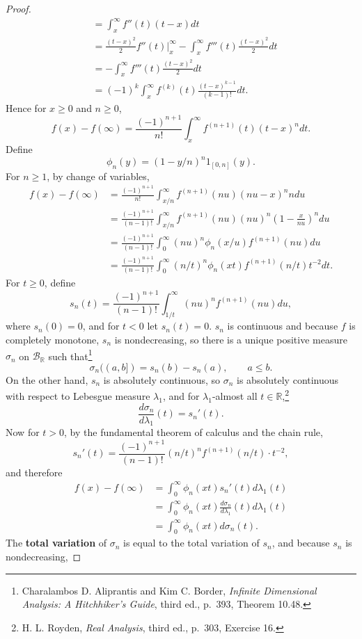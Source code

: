 \documentclass{article}
\theoremstyle{definition}
\theoremstyle{definition}
\begin{document}
\begin{proof}
\begin{align*}
&=\int_x^\infty f''(t) (t-x) dt\\
&=\frac{(t-x)^2}{2} f''(t) \Big|_x^\infty - \int_x^\infty f'''(t) \frac{(t-x)^2}{2} dt\\
&=- \int_x^\infty f'''(t) \frac{(t-x)^2}{2} dt\\
&=(-1)^k \int_x^\infty f^{(k)}(t) \frac{(t-x)^{k-1}}{(k-1)!} dt.
\end{align*}
Hence for $x \geq 0$ and $n \geq 0$, 
\[
f(x)-f(\infty) = \frac{(-1)^{n+1}}{n!} \int_x^\infty f^{(n+1)}(t) (t-x)^n dt.
\]
Define
\[
\phi_n(y) = (1-y/n)^n 1_{[0,n]}(y).
\]
For $n \geq 1$,
by change of variables,
\begin{align*}
f(x)-f(\infty)&=\frac{(-1)^{n+1}}{n!} \int_{x/n}^\infty f^{(n+1)}(nu) (nu-x)^n ndu\\
&=\frac{(-1)^{n+1}}{(n-1)!} \int_{x/n}^\infty f^{(n+1)}(nu) (nu)^n \left(1-\frac{x}{nu}\right)^n du\\
&=\frac{(-1)^{n+1}}{(n-1)!} \int_0^\infty (nu)^n \phi_n(x/u) f^{(n+1)}(nu)  du\\
&=\frac{(-1)^{n+1}}{(n-1)!} \int_0^\infty (n/t)^n \phi_n(xt) f^{(n+1)}(n/t) t^{-2}dt.
\end{align*}
For $t \geq 0$, define
\[
s_n(t) = \frac{(-1)^{n+1}}{(n-1)!} \int_{1/t}^\infty  (nu)^n f^{(n+1)}(nu) du,
\]
where $s_n(0)=0$, 
and for $t<0$ let $s_n(t)=0$. $s_n$ is continuous
and because $f$ is completely monotone, $s_n$ is nondecreasing, so there is a unique positive
measure $\sigma_n$ on $\mathscr{B}_{\mathbb{R}}$ such that\footnote{Charalambos D. Aliprantis
and Kim C. Border, {\em Infinite Dimensional Analysis: A Hitchhiker's Guide}, third ed., p.~393, Theorem 10.48.}
\[
\sigma_n((a,b])=s_n(b)-s_n(a),\qquad a \leq b.
\]
On the other hand, $s_n$ is absolutely continuous, so $\sigma_n$ is absolutely continuous with respect to
Lebesgue measure $\lambda_1$, and for $\lambda_1$-almost all $t \in \mathbb{R}$,\footnote{H. L. Royden, {\em Real Analysis},
third ed., p.~303, Exercise 16.}
\[
\frac{d\sigma_n}{d\lambda_1}(t) = s_n'(t).
\]
Now for $t>0$, by the fundamental theorem of calculus and the chain
rule,
\[
s_n'(t) = \frac{(-1)^{n+1}}{(n-1)!} (n/t)^n f^{(n+1)}(n/t) \cdot t^{-2},
\]
and therefore
\begin{align*}
f(x)-f(\infty)&=\int_0^\infty \phi_n(xt) s_n'(t) d\lambda_1(t)\\
&=\int_0^\infty \phi_n(xt) \frac{d\sigma_n}{d\lambda_1}(t) d\lambda_1(t)\\
&=\int_0^\infty \phi_n(xt) d\sigma_n(t).
\end{align*}
The \textbf{total variation} of $\sigma_n$ is equal to the total variation of $s_n$, and because $s_n$ is nondecreasing,

\end{proof}
\end{document}
